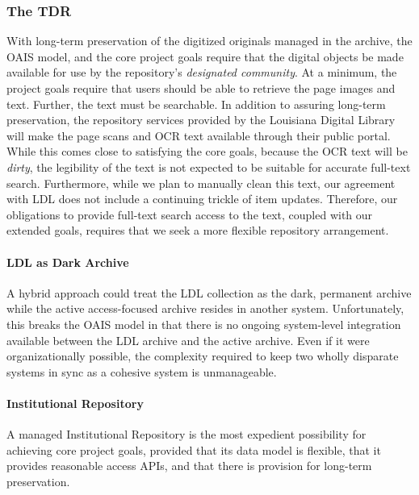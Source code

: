 \subsubsection{The \projectname{} TDR}
With long-term preservation of the digitized originals managed in the archive, the OAIS model, and the core project goals require that the digital objects be made available for use by the repository's \emph{designated community}. At a minimum, the project goals require that users should be able to retrieve the page images and text. Further, the text must be searchable. In addition to assuring long-term preservation, the repository services provided by the Louisiana Digital Library will make the page scans and OCR text available through their public portal. While this comes close to satisfying the core goals, because the OCR text will be \emph{dirty}, the legibility of the text is not expected to be suitable for accurate full-text search. Furthermore, while we plan to manually clean this text, our agreement with LDL does not include a continuing trickle of item updates. Therefore, our obligations to provide full-text search access to the text, coupled with our extended goals, requires that we seek a more flexible repository arrangement.

\paragraph{LDL as Dark Archive}A hybrid approach could treat the LDL collection as the dark, permanent archive while the active access-focused archive resides in another system. Unfortunately, this breaks the OAIS model in that there is no ongoing system-level integration available between the LDL archive and the active archive. Even if it were organizationally possible, the complexity required to keep two wholly disparate systems in sync as a cohesive system is unmanageable. 

\paragraph{Institutional Repository}
A managed Institutional Repository is the most expedient possibility for achieving core project goals, provided that its data model is flexible, that it provides reasonable access APIs, and that there is provision for long-term preservation.

